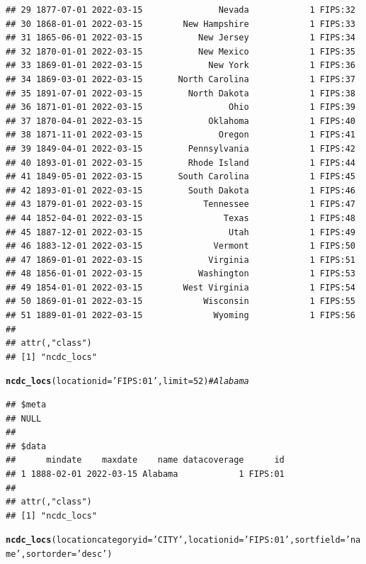 \documentclass{article}\usepackage[]{graphicx}\usepackage[]{color}
\makeatletter
\newcommand{\hlnum}[1]{\textcolor[rgb]{0.686,0.059,0.569}{#1}}%
\newcommand{\hlstr}[1]{\textcolor[rgb]{0.192,0.494,0.8}{#1}}%
\newcommand{\hlcom}[1]{\textcolor[rgb]{0.678,0.584,0.686}{\textit{#1}}}%
\newcommand{\hlstd}[1]{\textcolor[rgb]{0.345,0.345,0.345}{#1}}%
\newcommand{\hlkwc}[1]{\textcolor[rgb]{0.333,0.667,0.333}{#1}}%
\newcommand{\hlkwd}[1]{\textcolor[rgb]{0.737,0.353,0.396}{\textbf{#1}}}%
\newenvironment{kframe}{%
 \def\at@end@of@kframe{}%
 \ifinner\ifhmode%
  \def\at@end@of@kframe{\end{minipage}}%
  \begin{minipage}{\columnwidth}%
 \fi\fi%
 \def\FrameCommand##1{\hskip\@totalleftmargin \hskip-\fboxsep
 \colorbox{shadecolor}{##1}\hskip-\fboxsep
     \hskip-\linewidth \hskip-\@totalleftmargin \hskip\columnwidth}%
 \MakeFramed {\advance\hsize-\width
   \@totalleftmargin\z@ \linewidth\hsize
   \@setminipage}}%
 {\par\unskip\endMakeFramed%
 \at@end@of@kframe}
\newenvironment{knitrout}{}{} %
\makeatother
\begin{document}
\begin{knitrout}
\begin{kframe}
\begin{verbatim}
## 29 1877-07-01 2022-03-15               Nevada            1 FIPS:32
## 30 1868-01-01 2022-03-15        New Hampshire            1 FIPS:33
## 31 1865-06-01 2022-03-15           New Jersey            1 FIPS:34
## 32 1870-01-01 2022-03-15           New Mexico            1 FIPS:35
## 33 1869-01-01 2022-03-15             New York            1 FIPS:36
## 34 1869-03-01 2022-03-15       North Carolina            1 FIPS:37
## 35 1891-07-01 2022-03-15         North Dakota            1 FIPS:38
## 36 1871-01-01 2022-03-15                 Ohio            1 FIPS:39
## 37 1870-04-01 2022-03-15             Oklahoma            1 FIPS:40
## 38 1871-11-01 2022-03-15               Oregon            1 FIPS:41
## 39 1849-04-01 2022-03-15         Pennsylvania            1 FIPS:42
## 40 1893-01-01 2022-03-15         Rhode Island            1 FIPS:44
## 41 1849-05-01 2022-03-15       South Carolina            1 FIPS:45
## 42 1893-01-01 2022-03-15         South Dakota            1 FIPS:46
## 43 1879-01-01 2022-03-15            Tennessee            1 FIPS:47
## 44 1852-04-01 2022-03-15                Texas            1 FIPS:48
## 45 1887-12-01 2022-03-15                 Utah            1 FIPS:49
## 46 1883-12-01 2022-03-15              Vermont            1 FIPS:50
## 47 1869-01-01 2022-03-15             Virginia            1 FIPS:51
## 48 1856-01-01 2022-03-15           Washington            1 FIPS:53
## 49 1854-01-01 2022-03-15        West Virginia            1 FIPS:54
## 50 1869-01-01 2022-03-15            Wisconsin            1 FIPS:55
## 51 1889-01-01 2022-03-15              Wyoming            1 FIPS:56
## 
## attr(,"class")
## [1] "ncdc_locs"
\end{verbatim}
\begin{alltt}
\hlkwd{ncdc_locs}\hlstd{(}\hlkwc{locationid}\hlstd{=}\hlstr{'FIPS:01'}\hlstd{,} \hlkwc{limit}\hlstd{=}\hlnum{52}\hlstd{)} \hlcom{# Alabama}
\end{alltt}
\begin{verbatim}
## $meta
## NULL
## 
## $data
##      mindate    maxdate    name datacoverage      id
## 1 1888-02-01 2022-03-15 Alabama            1 FIPS:01
## 
## attr(,"class")
## [1] "ncdc_locs"
\end{verbatim}
\begin{alltt}
\hlkwd{ncdc_locs}\hlstd{(}\hlkwc{locationcategoryid}\hlstd{=}\hlstr{'CITY'}\hlstd{,} \hlkwc{locationid}\hlstd{=}\hlstr{'FIPS:01'}\hlstd{,} \hlkwc{sortfield}\hlstd{=}\hlstr{'name'}\hlstd{,} \hlkwc{sortorder}\hlstd{=}\hlstr{'desc'}\hlstd{)}
\end{alltt}
\begin{verbatim}

\end{verbatim}
\end{kframe}
\end{knitrout}
\end{document}
